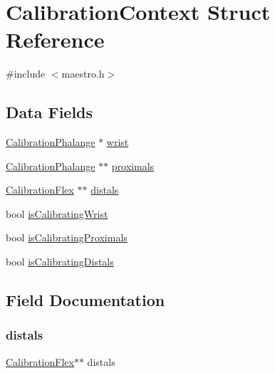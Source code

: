 \hypertarget{struct_calibration_context}{}\section{Calibration\+Context Struct Reference}
\label{struct_calibration_context}


{\ttfamily \#include $<$maestro.\+h$>$}

\subsection*{Data Fields}
\begin{DoxyCompactItemize}
\item 
\hyperlink{maestro_8h_a09681c098cfa56729e216f222d0486b2}{Calibration\+Phalange} $\ast$ \hyperlink{struct_calibration_context_a6c207403d305e2cdfea2fb0676209261}{wrist}
\item 
\hyperlink{maestro_8h_a09681c098cfa56729e216f222d0486b2}{Calibration\+Phalange} $\ast$$\ast$ \hyperlink{struct_calibration_context_abc394dd4f033a85949b224f4562335a0}{proximals}
\item 
\hyperlink{struct_calibration_flex}{Calibration\+Flex} $\ast$$\ast$ \hyperlink{struct_calibration_context_a7017c3e549a6fd2311971026e1787466}{distals}
\item 
bool \hyperlink{struct_calibration_context_abd15e9831a5ba96ffdac2870b9166d6f}{is\+Calibrating\+Wrist}
\item 
bool \hyperlink{struct_calibration_context_af84b387233c9acd70972ec87ad94656d}{is\+Calibrating\+Proximals}
\item 
bool \hyperlink{struct_calibration_context_a4ed5f719be46478bb69a3100e3be80d2}{is\+Calibrating\+Distals}
\end{DoxyCompactItemize}


\subsection{Field Documentation}
\mbox{\label{struct_calibration_context_a7017c3e549a6fd2311971026e1787466}} 
\subsubsection{\texorpdfstring{distals}{distals}}
{\footnotesize\ttfamily \hyperlink{struct_calibration_flex}{Calibration\+Flex}$\ast$$\ast$ distals}

